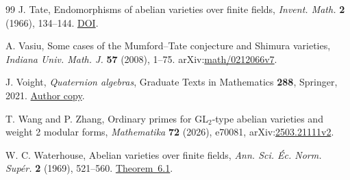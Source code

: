 \documentclass[11pt]{article}
\theoremstyle{definition}
\begin{document}
\begin{thebibliography}{99}
J. Tate, Endomorphisms of abelian varieties over finite fields,
\emph{Invent. Math.} \textbf{2} (1966), 134--144.
\href{https://doi.org/10.1007/BF01404549}{DOI}.

A. Vasiu, Some cases of the Mumford--Tate conjecture and Shimura
varieties, \emph{Indiana Univ. Math. J.} \textbf{57} (2008), 1--75.
arXiv:\href{https://arxiv.org/abs/math/0212066v7}{math/0212066v7}.

J. Voight, \emph{Quaternion algebras}, Graduate Texts in Mathematics
\textbf{288}, Springer, 2021.
\href{https://jvoight.github.io/quat-book.pdf}{Author copy}.

T. Wang and P. Zhang, Ordinary primes for GL\(_2\)-type abelian
varieties and weight 2 modular forms,
\emph{Mathematika} \textbf{72} (2026), e70081,
arXiv:\href{https://arxiv.org/abs/2503.21111v2}{2503.21111v2}.

W. C. Waterhouse, Abelian varieties over finite fields,
\emph{Ann. Sci. \'Ec. Norm. Sup\'er.} \textbf{2} (1969), 521--560.
\href{https://www.numdam.org/item/ASENS_1969_4_2_4_521_0/}{Theorem~6.1}.
\end{thebibliography}
\end{document}
